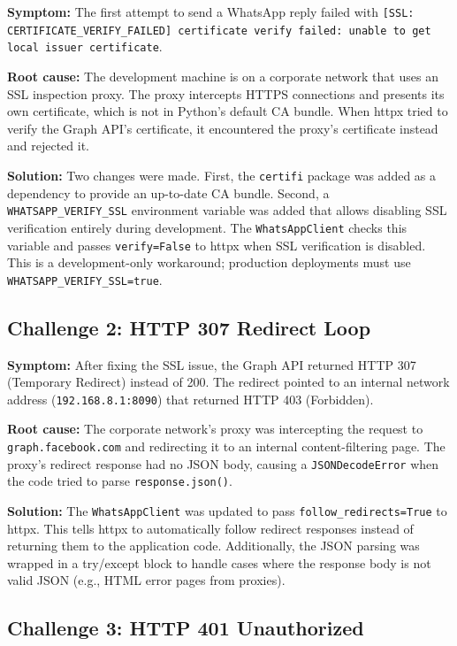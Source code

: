 \documentclass[12pt, a4paper]{report}
\begin{document}
\textbf{Symptom:} The first attempt to send a WhatsApp reply failed with \texttt{[SSL: CERTIFICATE\_VERIFY\_FAILED] certificate verify failed: unable to get local issuer certificate}.

\textbf{Root cause:} The development machine is on a corporate network that uses an SSL inspection proxy. The proxy intercepts HTTPS connections and presents its own certificate, which is not in Python's default CA bundle. When httpx tried to verify the Graph API's certificate, it encountered the proxy's certificate instead and rejected it.

\textbf{Solution:} Two changes were made. First, the \texttt{certifi} package was added as a dependency to provide an up-to-date CA bundle. Second, a \texttt{WHATSAPP\_VERIFY\_SSL} environment variable was added that allows disabling SSL verification entirely during development. The \texttt{WhatsAppClient} checks this variable and passes \texttt{verify=False} to httpx when SSL verification is disabled. This is a development-only workaround; production deployments must use \texttt{WHATSAPP\_VERIFY\_SSL=true}.

\subsection{Challenge 2: HTTP 307 Redirect Loop}

\textbf{Symptom:} After fixing the SSL issue, the Graph API returned HTTP 307 (Temporary Redirect) instead of 200. The redirect pointed to an internal network address (\texttt{192.168.8.1:8090}) that returned HTTP 403 (Forbidden).

\textbf{Root cause:} The corporate network's proxy was intercepting the request to \texttt{graph.facebook.com} and redirecting it to an internal content-filtering page. The proxy's redirect response had no JSON body, causing a \texttt{JSONDecodeError} when the code tried to parse \texttt{response.json()}.

\textbf{Solution:} The \texttt{WhatsAppClient} was updated to pass \texttt{follow\_redirects=True} to httpx. This tells httpx to automatically follow redirect responses instead of returning them to the application code. Additionally, the JSON parsing was wrapped in a try/except block to handle cases where the response body is not valid JSON (e.g., HTML error pages from proxies).

\subsection{Challenge 3: HTTP 401 Unauthorized}
\end{document}
